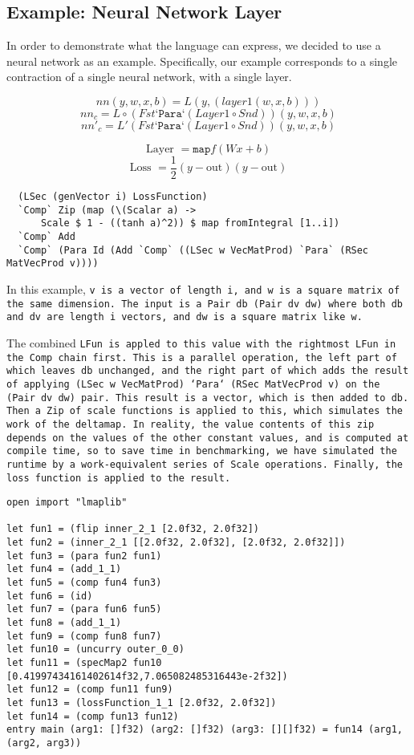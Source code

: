 \subsection{Example:  Neural Network Layer}
In order to demonstrate what the language can express, we decided to use a
neural network as an example. Specifically, our example corresponds to a single contraction of a single neural network, with a single layer.

\[nn(y,w,x,b) = L(y,(layer1(w,x,b)))\]
\[nn_c = L \circ (Fst \texttt{`Para`} (Layer1 \circ Snd)) (y, w,x,b)\]
\[nn'_c = L' (Fst \texttt{`Para`} (Layer1 \circ Snd)) (y, w,x,b)\]

\[\text{Layer } = \texttt{map} f (W x + b)\]
\[\text{Loss } = \frac{1}{2} (y-\text{out} )(y-\text{out}) \]

\begin{verbatim}
  (LSec (genVector i) LossFunction)
  `Comp` Zip (map (\(Scalar a) ->
      Scale $ 1 - ((tanh a)^2)) $ map fromIntegral [1..i])
  `Comp` Add
  `Comp` (Para Id (Add `Comp` ((LSec w VecMatProd) `Para` (RSec MatVecProd v))))
\end{verbatim}

In this example, \tt{v} is a vector of length \tt{i}, and \tt{w} is a square
matrix of the same dimension. The input is a \tt{Pair db (Pair dv dw)} where
both \tt{db} and \tt{dv} are length \tt{i} vectors, and \tt{dw} is a square
matrix like \tt{w}.

The combined \tt{LFun} is appled to this value with the rightmost \tt{LFun}
in the \tt{Comp} chain first. This is a parallel operation, the left part of
which leaves \tt{db} unchanged, and the right part of which adds the result
of applying \tt{(LSec w VecMatProd) `Para` (RSec MatVecProd v)} on the
\tt{(Pair dv dw)} pair. This result is a vector, which is then added to
\tt{db}. Then a Zip of scale functions is applied to this, which simulates
the work of the deltamap. In reality, the value contents of this zip depends
on the values of the other constant values, and is computed at compile time,
so to save time in benchmarking, we have simulated the runtime by a
work-equivalent series of \tt{Scale} operations. Finally, the loss function
is applied to the result.

\begin{verbatim}
open import "lmaplib"

let fun1 = (flip inner_2_1 [2.0f32, 2.0f32])
let fun2 = (inner_2_1 [[2.0f32, 2.0f32], [2.0f32, 2.0f32]])
let fun3 = (para fun2 fun1)
let fun4 = (add_1_1)
let fun5 = (comp fun4 fun3)
let fun6 = (id)
let fun7 = (para fun6 fun5)
let fun8 = (add_1_1)
let fun9 = (comp fun8 fun7)
let fun10 = (uncurry outer_0_0)
let fun11 = (specMap2 fun10 [0.41997434161402614f32,7.065082485316443e-2f32])
let fun12 = (comp fun11 fun9)
let fun13 = (lossFunction_1_1 [2.0f32, 2.0f32])
let fun14 = (comp fun13 fun12)
entry main (arg1: []f32) (arg2: []f32) (arg3: [][]f32) = fun14 (arg1, (arg2, arg3))
\end{verbatim}

